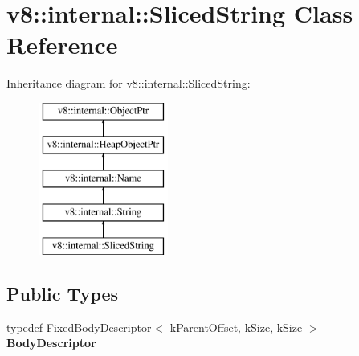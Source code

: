 \hypertarget{classv8_1_1internal_1_1SlicedString}{}\section{v8\+:\+:internal\+:\+:Sliced\+String Class Reference}
\label{classv8_1_1internal_1_1SlicedString}
Inheritance diagram for v8\+:\+:internal\+:\+:Sliced\+String\+:\begin{figure}[H]
\begin{center}
\leavevmode
\includegraphics[height=5.000000cm]{classv8_1_1internal_1_1SlicedString}
\end{center}
\end{figure}
\subsection*{Public Types}
\begin{DoxyCompactItemize}
\item 
\mbox{\label{classv8_1_1internal_1_1SlicedString_a1e7e701bb5f8acb3c0150111baf583c1}} 
typedef \mbox{\hyperlink{classv8_1_1internal_1_1FixedBodyDescriptor}{Fixed\+Body\+Descriptor}}$<$ k\+Parent\+Offset, k\+Size, k\+Size $>$ {\bfseries Body\+Descriptor}
\end{DoxyCompactItemize}
